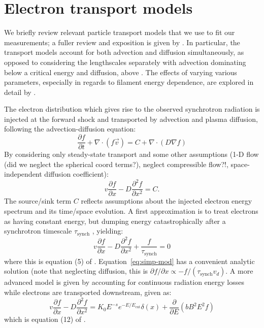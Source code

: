 \documentclass[iop, apj, numberedappendix, twocolappendix]{emulateapj}
\newcommand*{\mt}{\mathrm}
\newcommand*{\ptl}{\partial}
\newcommand*{\del}{\nabla}
\newcommand*{\tsynch}{\tau_{\mt{synch}}}
\begin{document}
\section{Electron transport models}\label{sec:transport}

We briefly review relevant particle transport models that we use to fit our
measurements; a fuller review and exposition is given by .
  In particular, the transport models
account for both advection and diffusion simultaneously, as opposed to
considering the lengthscales separately with advection dominating below a
critical energy and diffusion, above
\citep{bamba2003, vink2003, yamazaki2004, bamba2005-hist}
.
The effects of varying various parameters, especially in regards to filament
energy dependence, are explored in detail by .

The electron distribution which gives rise to the observed synchrotron
radiation is injected at the forward shock and transported by advection
and plasma diffusion, following the advection-diffusion equation:
\[
  \frac{\ptl f}{\ptl t} + \del \cdot \left( f \vec{v} \right)
  = C + \del \cdot \left( D \del f \right)
\]
By considering only steady-state transport and some other assumptions
(1-D flow (did we neglect the spherical coord terms?), neglect compressible flow?!,
space-independent diffusion coefficient):
\[
    v \frac{\ptl f}{\ptl x} - D \frac{\ptl^2 f}{\ptl x^2} = C .
\]
The source/sink term $C$ reflects assumptions about the injected electron
energy spectrum and its time/space evolution.
A first approximation is to treat electrons as having constant energy, but
dumping energy catastrophically after a synchrotron timescale
$\tsynch$ , yielding:
\begin{equation} \label{eq:simp-mod}
    v \frac{\ptl f}{\ptl x} - D \frac{\ptl^2 f}{\ptl x^2} +
    \frac{f}{\tau_{\mt{synch}}} = 0
\end{equation}
where this is equation (5) of .
Equation~\eqref{eq:simp-mod} has a convenient analytic solution (note that
neglecting diffusion, this is $\ptl f/\ptl x \propto -f/(\tsynch v_d)$.
A more advanced model is given by accounting for continuous radiation energy
losses while electrons are transported downstream, given as:
\begin{equation} \label{eq:full-mod}
    v \frac{\ptl f}{\ptl x} - D \frac{\ptl^2 f}{\ptl x^2} =
    K_0 E^{-s} e^{-E/E_{\mt{cut}}} \delta(x) + \frac{\ptl}{\ptl E}
      \left(bB^2E^2f\right)
\end{equation}
which is equation (12) of .
\end{document}
